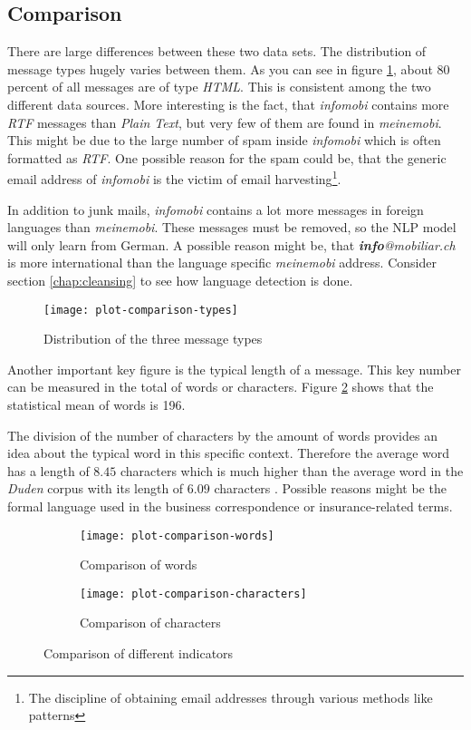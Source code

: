\subsection{Comparison}

There are large differences between these two data sets. The distribution of message types hugely varies between them. As you can see in figure \ref{fig:plot-comparison-types}, about 80 percent of all messages are of type \emph{HTML}. This is consistent among the two different data sources. More interesting is the fact, that \emph{infomobi} contains more \emph{RTF} messages than \emph{Plain Text}, but very few of them are found in \emph{meinemobi}. This might be due to the large number of spam inside \emph{infomobi} which is often formatted as \emph{RTF}. One possible reason for the spam could be, that the generic email address of \emph{infomobi} is the victim of email harvesting\footnote{The discipline of obtaining email addresses through various methods like patterns}.

In addition to junk mails, \emph{infomobi} contains a lot more messages in foreign languages than \emph{meinemobi}. These messages must be removed, so the NLP model will only learn from German. A possible reason might be, that \emph{\textbf{info}@mobiliar.ch} is more international than the language specific \emph{meinemobi} address. Consider section \ref{chap:cleansing} to see how language detection is done.

\begin{figure}[!ht]
    \centering
    \texttt{[image: plot-comparison-types]}
    \caption{Distribution of the three message types}
    \label{fig:plot-comparison-types}
\end{figure}

Another important key figure is the typical length of a message. This key number can be measured in the total of words or characters. Figure \ref{fig:plot-comparison-words} shows that the statistical mean of words is 196.

The division of the number of characters by the amount of words provides an idea about the typical word in this specific context. Therefore the average word has a length of $8.45$ characters which is much higher than the average word in the \emph{Duden} corpus with its length of $6.09$ characters \cite{duden}. Possible reasons might be the formal language used in the business correspondence or insurance-related terms.

\begin{figure}[!ht]
    \begin{subfigure}{0.5\textwidth}
        \texttt{[image: plot-comparison-words]}
        \caption{Comparison of words}
        \label{fig:plot-comparison-words}
    \end{subfigure}
    \begin{subfigure}{0.5\textwidth}
        \texttt{[image: plot-comparison-characters]}
        \caption{Comparison of characters}
        \label{fig:plot-comparison-characters}
    \end{subfigure}
    \caption{Comparison of different indicators}
\end{figure}

